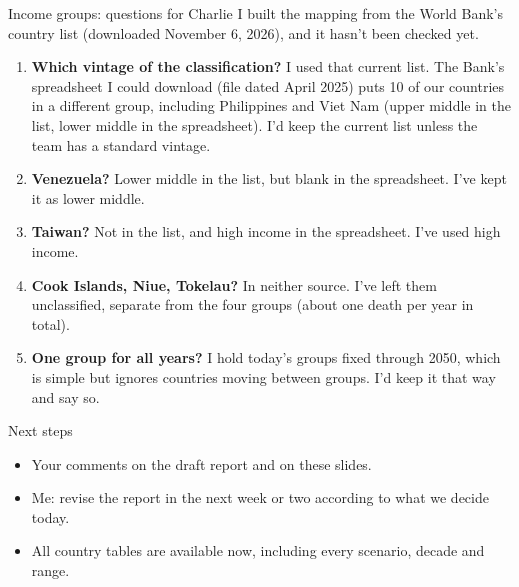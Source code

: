 \documentclass[aspectratio=169,11pt]{beamer}
\begin{document}
\begin{frame}{Income groups: questions for Charlie}
  \small
  I built the mapping from the World Bank's country list (downloaded November 6, 2026), and it hasn't been checked yet.
  \begin{enumerate}
    \item \textbf{Which vintage of the classification?} I used that current list. The Bank's spreadsheet I could download (file dated April 2025) puts 10 of our countries in a different group, including Philippines and Viet Nam (upper middle in the list, lower middle in the spreadsheet). I'd keep the current list unless the team has a standard vintage.
    \item \textbf{Venezuela?} Lower middle in the list, but blank in the spreadsheet. I've kept it as lower middle.
    \item \textbf{Taiwan?} Not in the list, and high income in the spreadsheet. I've used high income.
    \item \textbf{Cook Islands, Niue, Tokelau?} In neither source. I've left them unclassified, separate from the four groups (about one death per year in total).
    \item \textbf{One group for all years?} I hold today's groups fixed through 2050, which is simple but ignores countries moving between groups. I'd keep it that way and say so.
  \end{enumerate}
\end{frame}

\begin{frame}{Next steps}
  \begin{itemize}
    \item Your comments on the draft report and on these slides.
    \item Me: revise the report in the next week or two according to what we decide today.
    \item All country tables are available now, including every scenario, decade and range.
  \end{itemize}
\end{frame}
\end{document}
